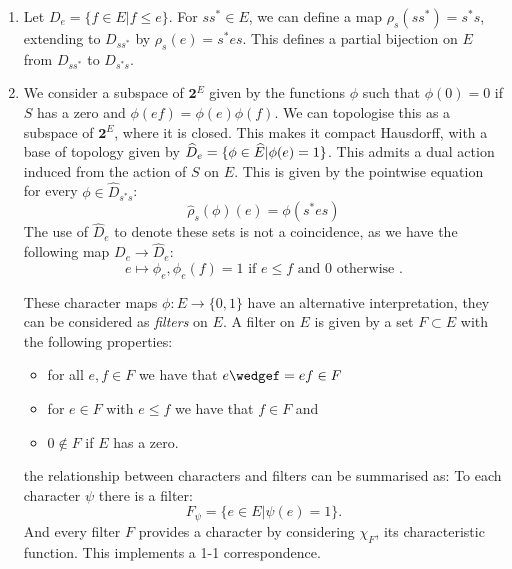 \begin{example}
\begin{definition}

\begin{enumerate}
\item Let $D_{e}=\lbrace f \in E | f \leq e \rbrace$. For $ss^{*} \in E$, we can define a map $\rho_{s}(ss^{*})=s^{*}s$, extending to $D_{ss^{*}}$ by $\rho_{s}(e) = s^{*}es$. This defines a partial bijection on $E$ from $D_{ss^{*}}$ to $D_{s^{*}s}$. 

\item We consider a subspace of $\textbf{2}^{E}$ given by the functions $\phi$ such that $\phi(0)=0$ if $S$ has a zero and $\phi(ef)=\phi(e)\phi(f)$. We can topologise this as a subspace of $\textbf{2}^{E}$, where it is closed. This makes it compact Hausdorff, with a base of topology given by $\widehat{D}_{e}= \lbrace \phi \in \widehat{E} | \phi(e)=1 \rbrace$. This admits a dual action induced from the action of $S$ on $E$. This is given by the pointwise equation for every $\phi \in \widehat{D}_{s^{*}s}$:
\begin{equation*}
\widehat{\rho}_{s}(\phi)(e)=\phi(s^{*}es)
\end{equation*}
The use of $\widehat{D}_{e}$ to denote these sets is not a coincidence, as we have the following map $D_{e} \rightarrow \widehat{D}_{e}$:
\begin{equation*}
e \mapsto \phi_{e}, \phi_{e}(f)=1 \mbox{ if } e \leq f \mbox{ and } 0 \mbox{ otherwise }.
\end{equation*}
\begin{remark}
These character maps $\phi: E \rightarrow \lbrace 0,1 \rbrace$ have an alternative interpretation, they can be considered as \textit{filters} on $E$. A filter on $E$ is given by a set $F \subset E$ with the following properties:
\begin{itemize}
\item for all $e,f \in F$ we have that $e\wedgef=ef \in F$
\item for $e\in F$ with $e \leq f$ we have that $f \in F$ and
\item $0 \not\in F$ if $E$ has a zero.
\end{itemize}
the relationship between characters and filters can be summarised as: To each character $\psi$ there is a filter:
\begin{equation*}
F_{\psi}= \lbrace e \in E | \psi(e)=1 \rbrace.
\end{equation*}
And every filter $F$ provides a character by considering $\chi_{F}$, its characteristic function. This implements a 1-1 correspondence.
\end{remark}


\end{enumerate}
\end{definition}
\end{example}
